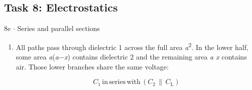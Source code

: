 \documentclass[11pt]{article}
\begin{document}
\begin{keepsection}\subsection{Task 8: Electrostatics}

\begin{workedbox}{8e \ensuremath{\cdot} Series and parallel sections}
\begin{enumerate}
\item {}
All paths pass through dielectric 1 across the full area \textit{a}\textsuperscript{2}. In the lower half, some area \textit{a}(\textit{a}\ensuremath{-}\textit{x}) contains dielectric 2 and the remaining area \textit{a x} contains air. Those lower branches share the same voltage:

\begin{equation*}{C}_{1}\, \text{in}\, \text{series}\, \text{with}\, ({C}_{2}\, \parallel \, {C}_{\mathrm{L}})\end{equation*}


\end{enumerate}
\end{workedbox}
\end{keepsection}
\end{document}
